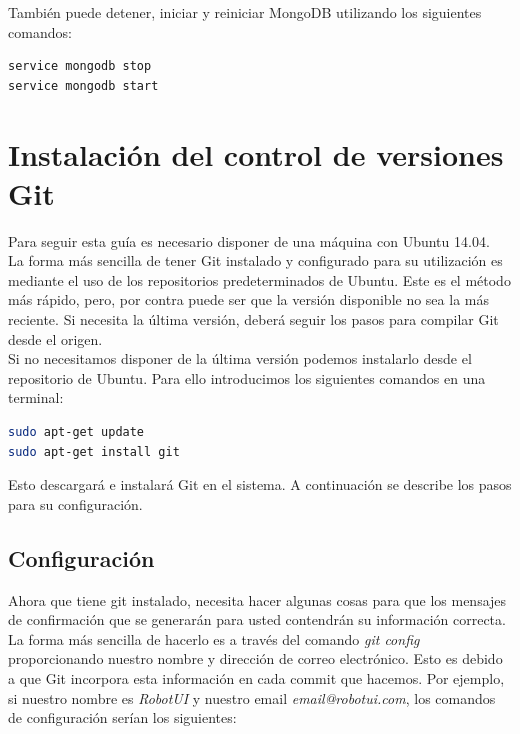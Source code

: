 También puede detener, iniciar y reiniciar MongoDB utilizando los siguientes comandos:\\

\begin{lstlisting}[language=bash]
service mongodb stop
service mongodb start
\end{lstlisting}


\section{Instalación del control de versiones Git}

Para seguir esta guía es necesario disponer de una máquina con Ubuntu 14.04.\\

La forma más sencilla de tener Git instalado y configurado para su utilización es mediante el uso de los repositorios predeterminados de Ubuntu. 
Este es el método más rápido, pero, por contra puede ser que la versión disponible no sea la más reciente. 
Si necesita la última versión, deberá seguir los pasos para compilar Git desde el origen.\\

Si no necesitamos disponer de la última versión podemos instalarlo desde el repositorio de Ubuntu. Para ello introducimos los siguientes comandos en una terminal:\\

\begin{lstlisting}[language=bash]
sudo apt-get update
sudo apt-get install git
\end{lstlisting}

Esto descargará e instalará Git en el sistema. A continuación se describe los pasos para su configuración.

\subsection{Configuración}

Ahora que tiene git instalado, necesita hacer algunas cosas para que los mensajes de confirmación que se generarán para usted contendrán su información correcta.\\

La forma más sencilla de hacerlo es a través del comando \emph{git config} proporcionando nuestro nombre y dirección de correo electrónico. Esto es debido a que Git incorpora esta información en cada commit
que hacemos. Por ejemplo, si nuestro nombre es \emph{RobotUI} y nuestro email \emph{email@robotui.com}, los comandos de configuración serían los siguientes:\\

